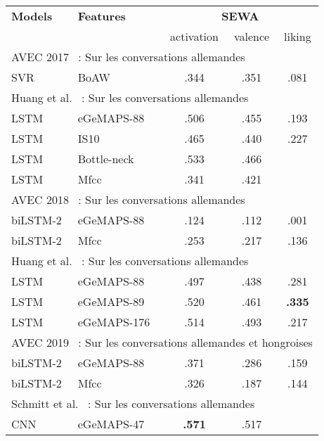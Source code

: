 \begin{table}[]
    \centering
    \begin{tabular}{| l | l | c | c | c |}
        \hline
        \textbf{Models} &\textbf{Features} &\multicolumn{3}{c|}{\textbf{SEWA}} \\ \cline{3-5}
        & &activation &valence &liking \\
        \hline
        \multicolumn{5}{|l|}{AVEC 2017~\cite{AVEC2017} : Sur les conversations allemandes} \\
        \hline
        SVR      &BoAW~\cite{Schmitt2016} &.344  &.351 &.081 \\
       \hline
       \multicolumn{5}{|l|}{Huang et al.~\cite{Huang2017} : Sur les conversations allemandes} \\
       \hline
       LSTM     &eGeMAPS-88  &.506  &.455 &.193 \\
       LSTM     &IS10        &.465  &.440 &.227 \\
       LSTM     &Bottle-neck~\cite{Fer2015} &.533  &.466 &     \\
       LSTM     &Mfcc        &.341  &.421 &     \\
        \hline
        \multicolumn{5}{|l|}{AVEC 2018~\cite{AVEC2018} : Sur les conversations allemandes} \\
        \hline
        biLSTM-2 &eGeMAPS-88  &.124  &.112 &.001 \\
        biLSTM-2 &Mfcc        &.253  &.217 &.136 \\
         \hline
       \multicolumn{5}{|l|}{Huang et al.~\cite{Huang2018} : Sur les conversations allemandes} \\
       \hline
       LSTM     &eGeMAPS-88   &.497  &.438 &.281 \\
       LSTM     &eGeMAPS-89   &.520  &.461 &\textbf{.335} \\
       LSTM     &eGeMAPS-176  &.514  &.493 &.217 \\
        \hline
        \multicolumn{5}{|l|}{AVEC 2019~\cite{AVEC2019} : Sur les conversations allemandes et hongroises} \\
        \hline
        biLSTM-2 &eGeMAPS-88  &.371 &.286 &.159 \\
        biLSTM-2 &Mfcc        &.326 &.187 &.144 \\
         \hline
       \multicolumn{5}{|l|}{Schmitt et al.~\cite{Schmitt2019} : Sur les conversations allemandes} \\
       \hline
       CNN      &eGeMAPS-47    &\textbf{.571}  &.517 & \\

\end{tabular}
\end{table}
